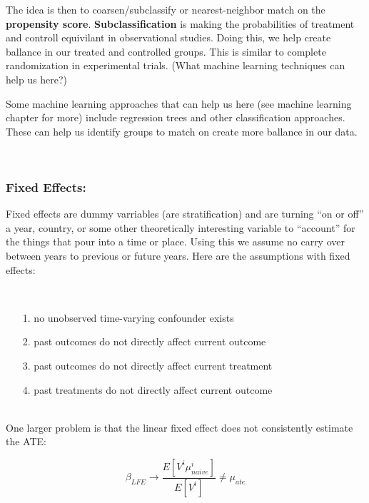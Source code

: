 \documentclass[12pt]{article}\usepackage[]{graphicx}\usepackage[]{color}
\begin{document}
\begin{flushleft}
The idea is then to coarsen/subclassify or nearest-neighbor match on the \textbf{propensity score}.   \textbf{Subclassification} is making the probabilities of treatment and controll equivilant in observational studies. Doing this, we help create ballance in our treated and controlled groups. This is similar to complete randomization in experimental trials. (What machine learning techniques can help us here?) 

Some machine learning approaches that can help us here (see machine learning chapter for more) include regression trees and other classification approaches. These can help us identify groups to match on create more ballance in our data.




\hfill \\

\subsubsection{Fixed Effects:}

Fixed effects are dummy varriables (are stratification) and are turning ``on or off'' a year, country, or some other theoretically interesting variable to ``account'' for the things that pour into a time or place. Using this we assume no carry over between years to previous or future years. Here are the assumptions with fixed effects:  

\hfill \\

\begin{itemize}
\item[1.] no unobserved time-varying confounder exists
\item[2.] past outcomes do not directly affect current outcome
\item[3.] past outcomes do not directly affect current treatment
\item[4.] past treatments do not directly affect current outcome
\end{itemize}

\hfill \\

\noindent One larger problem is that the linear fixed effect does not consistently estimate the ATE:

\begin{equation}
\beta_{LFE} \rightarrow \frac{E[V^i \mu^i_{naive}]}{E[V^i]} \neq \mu_{ate}
\end{equation}


\end{flushleft}
\end{document}
